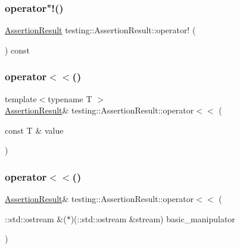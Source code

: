 \mbox{\label{classtesting_1_1_assertion_result_a5b0784686a756660ac8dfe528d89386b}} 
\subsubsection{\texorpdfstring{operator"!()}{operator!()}}
{\footnotesize\ttfamily \hyperlink{classtesting_1_1_assertion_result}{Assertion\+Result} testing\+::\+Assertion\+Result\+::operator! (\begin{DoxyParamCaption}{ }\end{DoxyParamCaption}) const}

\mbox{\label{classtesting_1_1_assertion_result_a3230efa81aafe7c61f5fb878cfa39e91}} 
\subsubsection{\texorpdfstring{operator$<$$<$()}{operator<<()}\hspace{0.1cm}{\footnotesize\ttfamily [1/2]}}
{\footnotesize\ttfamily template$<$typename T $>$ \\
\hyperlink{classtesting_1_1_assertion_result}{Assertion\+Result}\& testing\+::\+Assertion\+Result\+::operator$<$$<$ (\begin{DoxyParamCaption}\item[{const T \&}]{value }\end{DoxyParamCaption})\hspace{0.3cm}{\ttfamily [inline]}}

\mbox{\label{classtesting_1_1_assertion_result_a43ae8a260843ce2ff3dc9af262672b8b}} 
\subsubsection{\texorpdfstring{operator$<$$<$()}{operator<<()}\hspace{0.1cm}{\footnotesize\ttfamily [2/2]}}
{\footnotesize\ttfamily \hyperlink{classtesting_1_1_assertion_result}{Assertion\+Result}\& testing\+::\+Assertion\+Result\+::operator$<$$<$ (\begin{DoxyParamCaption}\item[{\+::std\+::ostream \&($\ast$)(\+::std\+::ostream \&stream)}]{basic\+\_\+manipulator }\end{DoxyParamCaption})\hspace{0.3cm}{\ttfamily [inline]}}

